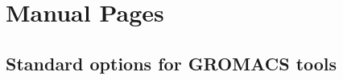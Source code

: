 \chapter{Manual Pages}
\label{app:progman}

\section{Standard options for GROMACS tools}\label{options}

{\small

}
{\small

}

